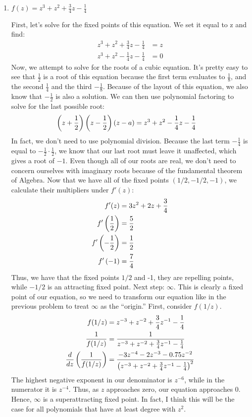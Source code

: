 \begin{enumerate}
\begin{enumerate}
	\item $f(z) = z^3 +z^2 +\frac{3}{4} z - \frac{1}{4}$
	\begin{problem}
		First, let's solve for the fixed points of this equation. We set it equal to z and find:
		\begin{align*}
			z^3 + z^2 + \frac{3}4z-\frac{1}4 &= z\\
			z^3 + z^2-\frac{1}4z - \frac{1}4 &= 0
		\end{align*}
		Now, we attempt to solve for the roots of a cubic equation. It's pretty easy to see that $\frac{1}2$ is a root of this equation because the first term evaluates to $\frac{1}8$, and the second $\frac{1}4$ and the third $-\frac{1}8$. Because of the layout of this equation, we also know that $-\frac{1}2$ is also a solution. We can then use polynomial factoring to solve for the last possible root:
		\begin{align*}
			\left(z+\frac{1}2\right)\left(z-\frac{1}2\right)\left(z -a\right)&= z^3 +z^2 -\frac{1}{4} z - \frac{1}{4}
		\end{align*}
		In fact, we don't need to use polynomial division. Because the last term $-\frac{1}4$ is equal to $-\frac{1}{2}\cdot \frac{1}2$, we know that our last root must leave it unaffected, which gives a root of $-1$. Even though all of our roots are real, we don't need to concern ourselves with imaginary roots because of the fundamental theorem of Algebra.\gline{}
		Now that we have all of the fixed points $(1/2, -1/2, -1)$, we calculate their multipliers under $f'(z)$:
		\begin{align*}
			f'(z) &= 3z^2 + 2z + \frac{3}4\\
			f'\left(\frac{1}2\right) &= \frac{5}2\\
			f'\left(-\frac{1}2\right) &= \frac{1}2\\
			f'\left(-1\right)&=\frac{7}4
		\end{align*}
		Thus, we have that the fixed points $1/2$ and -1, they are repelling points, while $-1/2$ is an attracting fixed point. \gline{}
		Next step: $\infty$. This is clearly a fixed point of our equation, so we need to transform our equation like in the previous problem to treat $\infty$ as the ``origin.'' First, consider $f(1/z)$.\gline{}
		\begin{align*}
			f(1/z) &= z^{-3}+z^{-2}+\frac{3}4z^{-1}-\frac{1}4\\
			\frac{1}{f(1/z)}&= \frac{1}{z^{-3}+z^{-2}+\frac{3}4z^{-1}-\frac{1}4}\\
			\frac{d}{dz}\left(\frac{1}{f(1/z)}\right)&= \frac{-3z^{-4}-2z^{-3}-0.75z^{-2}}{\left(z^{-3}+z^{-2}+\frac{3}4z^{-1}-\frac{1}4\right)^2}
		\end{align*}
		The highest negative exponent in our denominator is $z^{-6}$, while in the numerator it is $z^{-4}$. Thus, as $z$ approaches zero, our equation approaches 0. Hence, $\infty$ is a superattracting fixed point. In fact, I think this will be the case for all polynomials that have at least degree with $z^2$. 
	

\end{problem}
\end{enumerate}
\end{enumerate}

